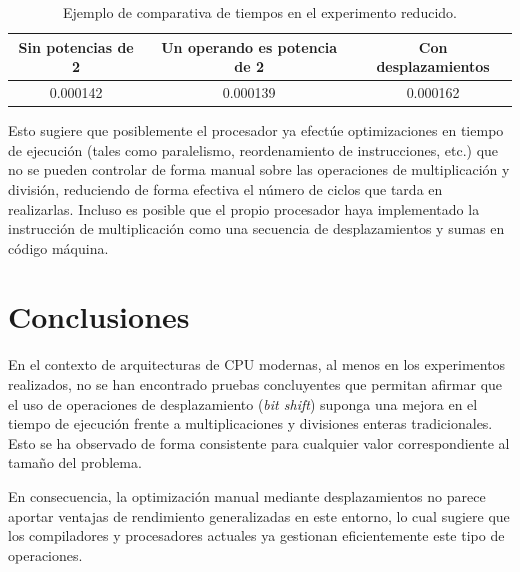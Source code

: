 \documentclass[11pt,a4paper,twoside]{article}
\theoremstyle{definition}
\begin{document}
	\begin{table} [H] \centering
		\begin{tabular} {| c | c | c |}
			\hline
			\textbf{Sin potencias de 2} & \textbf{Un operando es potencia de 2} & \textbf{Con desplazamientos} \\
			\hline
			 0.000142 & 0.000139 & 0.000162 \\
			 \hline
		\end{tabular}
		\caption{Ejemplo de comparativa de tiempos en el experimento reducido.}
		\label{tabla1}
	\end{table} 
	
	Esto sugiere que posiblemente el procesador ya efectúe optimizaciones en tiempo de ejecución (tales como paralelismo, reordenamiento de instrucciones, etc.) que no se pueden controlar de forma manual sobre las operaciones de multiplicación y división, reduciendo de forma efectiva el número de ciclos que tarda en realizarlas. Incluso es posible que el propio procesador haya implementado la instrucción de multiplicación como una secuencia de desplazamientos y sumas en código máquina.
	
	\section{Conclusiones}
	
	En el contexto de arquitecturas de CPU modernas, al menos en los experimentos realizados, no se han encontrado pruebas concluyentes que permitan afirmar que el uso de operaciones de desplazamiento (\textit{bit shift}) suponga una mejora en el tiempo de ejecución frente a multiplicaciones y divisiones enteras tradicionales. Esto se ha observado de forma consistente para cualquier valor correspondiente al tamaño del problema.
	
	En consecuencia, la optimización manual mediante desplazamientos no parece aportar ventajas de rendimiento generalizadas en este entorno, lo cual sugiere que los compiladores y procesadores actuales ya gestionan eficientemente este tipo de operaciones.


\printbibliography
	
	
	
\end{document}
